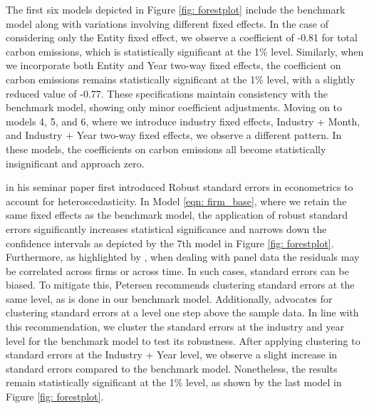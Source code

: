 \documentclass[12pt]{article}
\begin{document}
The first six models depicted in Figure \ref{fig: forestplot} include the benchmark model along with variations involving different fixed effects. In the case of considering only the Entity fixed effect, we observe a coefficient of -0.81 for total carbon emissions, which is statistically significant at the 1\% level. Similarly, when we incorporate both Entity and Year two-way fixed effects, the coefficient on carbon emissions remains statistically significant at the 1\% level, with a slightly reduced value of -0.77. These specifications maintain consistency with the benchmark model, showing only minor coefficient adjustments. Moving on to models 4, 5, and 6, where we introduce industry fixed effects, Industry + Month, and Industry + Year two-way fixed effects, we observe a different pattern. In these models, the coefficients on carbon emissions all become statistically insignificant and approach zero.

\cite{white1980heteroskedasticity} in his seminar paper first introduced Robust standard errors in econometrics to account for heteroscedasticity. In Model \ref{eqn: firm_base}, where we retain the same fixed effects as the benchmark model, the application of robust standard errors significantly increases statistical significance and narrows down the confidence intervals as depicted by the 7th model in Figure \ref{fig: forestplot}. Furthermore, as highlighted by \cite{petersen2008estimating}, when dealing with panel data the residuals may be correlated across firms or across time. In such cases, standard errors can be biased. To mitigate this, Petersen recommends clustering standard errors at the same level, as is done in our benchmark model. Additionally, \cite{angrist2009mostly} advocates for clustering standard errors at a level one step above the sample data. In line with this recommendation, we cluster the standard errors at the industry and year level for the benchmark model to test its robustness. After applying clustering to standard errors at the Industry + Year level, we observe a slight increase in standard errors compared to the benchmark model. Nonetheless, the results remain statistically significant at the 1\% level, as shown by the last model in Figure \ref{fig: forestplot}.
\end{document}

